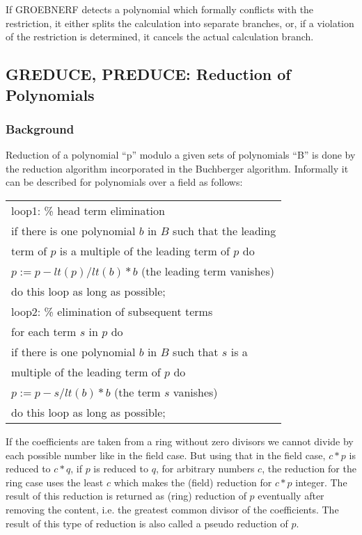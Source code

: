 If GROEBNERF detects a polynomial which formally conflicts with the
restriction, it either splits the calculation into separate branches, or,
if a violation of the restriction is determined, it cancels the actual
calculation branch.


\subsection{GREDUCE, PREDUCE: Reduction of Polynomials}


\subsubsection{Background} \label{GROEBNER:background}
Reduction of a polynomial ``p'' modulo a given sets of polynomials
``B'' is done by the reduction algorithm incorporated in the
Buchberger algorithm. Informally it can be described for
polynomials over a field as follows:
\begin{center}
\begin{tabular}{l}
loop1: \hspace*{2mm}\% head term elimination \\
\hspace*{-1cm} if there is one polynomial $b$ in $B$ such that the
leading \\ term of $p$ is a multiple of the leading term of $p$ do \\
$p := p - lt(p)/lt(b) * b$  (the leading term vanishes)\\
\hspace*{-1cm} do this loop as long as possible; \\
loop2: \hspace*{2mm} \% elimination of subsequent terms \\
\hspace*{-1cm} for each term $s$ in $p$ do \\
if there is one polynomial $b$ in $B$ such that $s$ is a\\
multiple of the leading term of $p$ do \\
$p := p - s/lt(b) * b$ (the term $s$ vanishes) \\
\hspace*{-1cm}do this loop as long as possible;
\end{tabular}
\end{center}

If the coefficients are taken from a ring without zero divisors we
cannot divide by each possible number like in the field case. But
using that in the field case,  $c*p $ is reduced to  $c*q $, if $ p $
is reduced to $ q $, for arbitrary numbers $ c $,  the reduction for
the ring case uses the least $ c $ which makes the (field) reduction
for $ c*p $ integer. The result of this reduction is returned as
(ring) reduction of $ p $ eventually after removing the content, i.e.
the greatest common divisor of the coefficients. The result of this
type of reduction is also called a pseudo reduction of $ p $.


